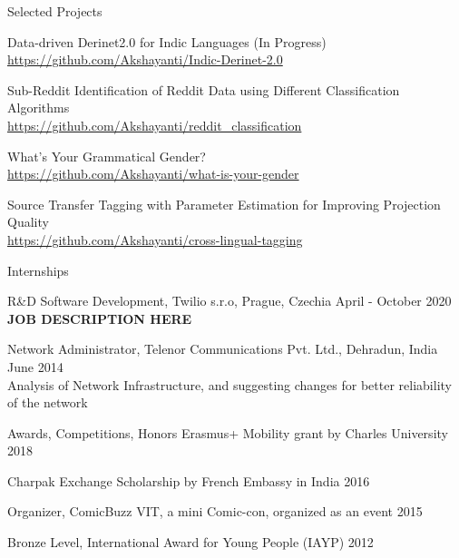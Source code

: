 \documentclass{resume} %
\begin{document}
\begin{rSection}{Selected Projects}

    {Data-driven Derinet2.0 for Indic Languages (In Progress)}\\
        \url{https://github.com/Akshayanti/Indic-Derinet-2.0}

    {Sub-Reddit Identification of Reddit Data using Different Classification Algorithms}\\
        \url{https://github.com/Akshayanti/reddit_classification}

    {What's Your Grammatical Gender?}\\
        \url{https://github.com/Akshayanti/what-is-your-gender}

    {Source Transfer Tagging with Parameter Estimation for Improving Projection Quality}\\
        \url{https://github.com/Akshayanti/cross-lingual-tagging}

\end{rSection}



\begin{rSection}{Internships}

    {R\&D Software Development, Twilio s.r.o, Prague, Czechia} 
        \hfill {April - October 2020}\\
            \textbf{JOB DESCRIPTION HERE}
    
    {Network Administrator, Telenor Communications Pvt. Ltd., Dehradun, India} 
        \hfill {June 2014}\\
            Analysis of Network Infrastructure, and suggesting changes for 
            better reliability of the network

\end{rSection}




\begin{rSection}{Awards, Competitions, Honors}
    {Erasmus+ Mobility grant by Charles University} \hfill
        {2018}

    {Charpak Exchange Scholarship by French Embassy in India} \hfill
        {2016}

    {Organizer, ComicBuzz VIT, a mini Comic-con, organized as an event} \hfill
        {2015}

    {Bronze Level, International Award for Young People (IAYP)} \hfill
        {2012}
\end{rSection}
\end{document}
